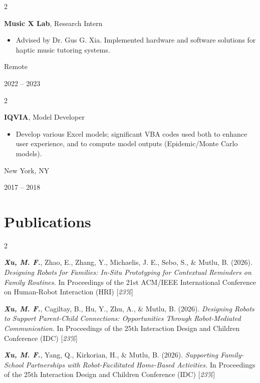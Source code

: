 \documentclass[10pt, letterpaper]{article}
\newenvironment{highlights}{
    \begin{itemize}[
        topsep=0.10 cm,
        parsep=0.10 cm,
        partopsep=0pt,
        itemsep=0pt,
        leftmargin=0.4 cm + 10pt
    ]
}{
    \end{itemize}
} %
\newenvironment{twocolentry}[2][]{
    \onecolentry
    \def\secondColumn{#2}
    \setcolumnwidth{\fill, 4.5 cm}
    \begin{paracol}{2}
}{
    \switchcolumn \raggedleft \secondColumn
    \end{paracol}
    \endonecolentry
} %
\begin{document}
        \vspace{0.1 cm}

        \begin{twocolentry}{
            Remote
            
            2022 -- 2023
        }
            \textbf{Music X Lab}, Research Intern
            \begin{highlights}
                \item Advised by Dr. Gus G. Xia. Implemented hardware and software solutions for haptic music tutoring systems.
            \end{highlights}
        \end{twocolentry}

        \vspace{0.1 cm}

        \begin{twocolentry}{
            New York, NY
            
            2017 -- 2018
        }
            \textbf{IQVIA}, Model Developer
            \begin{highlights}
                \item Develop various Excel models; significant VBA codes used both to enhance user experience, and to compute model outputs (Epidemic/Monte Carlo models).
            \end{highlights}
        \end{twocolentry}

    
    \section{Publications}

        \begin{samepage}
            \begin{twocolentry}{
                2026
            }
                \textbf{\textit{Xu, M. F.}}, Zhao, E., Zhang, Y., Michaelis, J. E., Sebo, S., \& Mutlu, B. (2026). \textit{Designing Robots for Families: In-Situ Prototyping for Contextual Reminders on Family Routines.} In Proceedings of the 21st ACM/IEEE International Conference on Human-Robot Interaction (HRI) [\textit{23\%}]

                \vspace{0.10 cm}

                \textbf{\textit{Xu, M. F.}}, Cagiltay, B., Hu, Y., Zhu, A., \& Mutlu, B. (2026). \textit{Designing Robots to Support Parent-Child Connections: Opportunities Through Robot-Mediated Communication.} In Proceedings of the 25th Interaction Design and Children Conference (IDC) [\textit{23\%}]

                \vspace{0.10 cm}

                \textbf{\textit{Xu, M. F.}}, Yang, Q., Kirkorian, H., \& Mutlu, B. (2026). \textit{Supporting Family-School Partnerships with Robot-Facilitated Home-Based Activities.} In Proceedings of the 25th Interaction Design and Children Conference (IDC) [\textit{23\%}]
            \end{twocolentry}
        \end{samepage}
\end{document}
